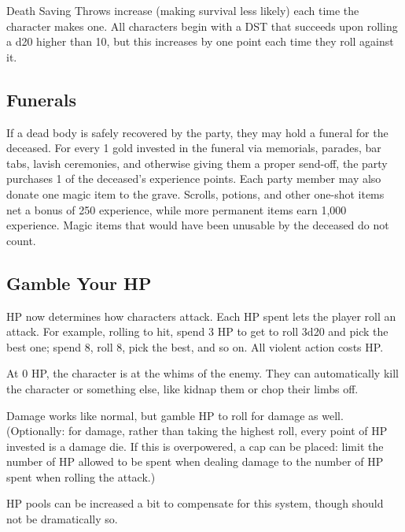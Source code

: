 \documentclass[twoside]{article}
\begin{document}
\bigbreak

Death Saving Throws increase (making survival less likely) each time the character makes one. All characters begin with a DST that succeeds upon rolling a d20 higher than 10, but this increases by one point each time they roll against it.

\subsection*{Funerals}

If a dead body is safely recovered by the party, they may hold a funeral for the deceased. For every 1 gold invested in the funeral via memorials, parades, bar tabs, lavish ceremonies, and otherwise giving them a proper send-off, the party purchases 1 of the deceased's experience points. Each party member may also donate one magic item to the grave. Scrolls, potions, and other one-shot items net a bonus of 250 experience, while more permanent items earn 1,000 experience. Magic items that would have been unusable by the deceased do not count.

\subsection*{Gamble Your HP}

HP now determines how characters attack. Each HP spent lets the player roll an attack. For example, rolling to hit, spend 3 HP to get to roll 3d20 and pick the best one; spend 8, roll 8, pick the best, and so on. All violent action costs HP. 

\bigbreak

At 0 HP, the character is at the whims of the enemy. They can automatically kill the character or something else, like kidnap them or chop their limbs off.

\bigbreak

Damage works like normal, but gamble HP to roll for damage as well. (Optionally: for damage, rather than taking the highest roll, every point of HP invested is a damage die. If this is overpowered, a cap can be placed: limit the number of HP allowed to be spent when dealing damage to the number of HP spent when rolling the attack.)

\bigbreak

HP pools can be increased a bit to compensate for this system, though should not be dramatically so.
\end{document}
